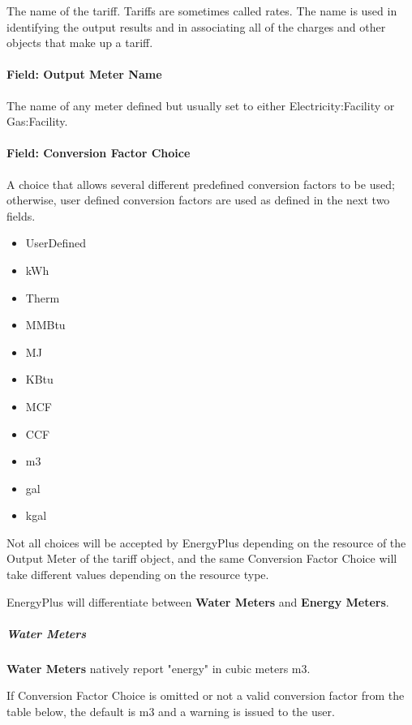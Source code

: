 The name of the tariff. Tariffs are sometimes called rates. The name is used in identifying the output results and in associating all of the charges and other objects that make up a tariff.

\paragraph{Field: Output Meter Name}\label{field-output-meter-name}

The name of any meter defined but usually set to either Electricity:Facility or Gas:Facility.

\paragraph{Field: Conversion Factor Choice}\label{field-conversion-factor-choice}

A choice that allows several different predefined conversion factors to be used; otherwise, user defined conversion factors are used as defined in the next two fields.

\begin{itemize}
\item
  UserDefined
\item
  kWh
\item
  Therm
\item
  MMBtu
\item
  MJ
\item
  KBtu
\item
  MCF
\item
  CCF
\item
  m3
\item
  gal
\item
  kgal
\end{itemize}

Not all choices will be accepted by EnergyPlus depending on the resource of the Output Meter of the tariff object, and the same Conversion Factor Choice will take different values depending on the resource type.

EnergyPlus will differentiate between \textbf{Water Meters} and \textbf{Energy Meters}.

\subparagraph{Water Meters}

\textbf{Water Meters} natively report "energy" in cubic meters m3.

If Conversion Factor Choice is omitted or not a valid conversion factor from the table below, the default is m3 and a warning is issued to the user.

